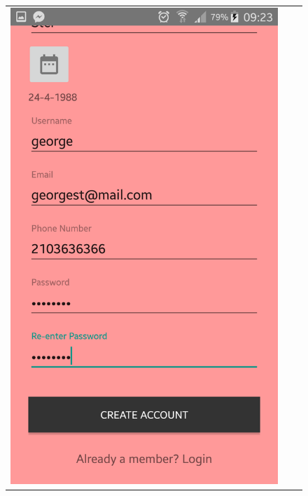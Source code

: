 \documentclass[12pt]{article}
\begin{document}
\begin{center}
\begin{figure}
\begin{tabular}{c c c}
				\includegraphics[scale=0.12, keepaspectratio]{03-register02.png}  
				&

\end{tabular}
\end{figure}
\end{center}
\end{document}
